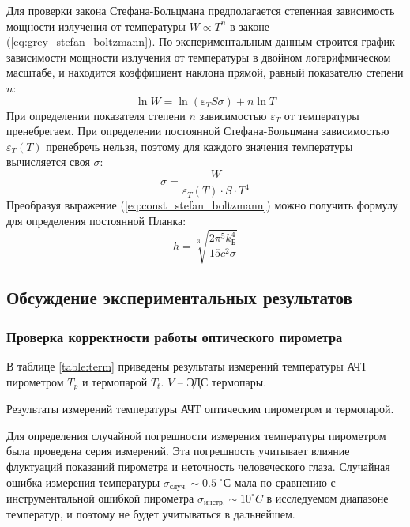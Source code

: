 \documentclass[10pt,a4paper]{article}
\newcommand{\cels}{\; ^\circ С}
\begin{document}
\begin{multicols}{2}
	Для проверки закона Стефана-Больцмана предполагается степенная зависимость мощности излучения от температуры $W \propto T^n$ в законе (\ref{eq:grey_stefan_boltzmann}). По экспериментальным данным строится график зависимости мощности излучения от температуры в двойном логарифмическом масштабе, и находится коэффициент наклона прямой, равный показателю степени $n$:
	\begin{equation}
		\ln W = \ln (\varepsilon_T S \sigma) + n \ln T
		\label{eq:lin_grey_stefan_boltzmann}
	\end{equation}
	При определении показателя степени $n$ зависимостью $\varepsilon_T$ от температуры пренебрегаем. При определении постоянной Стефана-Больцмана зависимостью $\varepsilon_T(T)$ пренебречь нельзя, поэтому для каждого значения температуры вычисляется своя $\sigma$:
	\begin{equation}
		\sigma = \frac{W}{\varepsilon_T(T) \cdot S \cdot T^4}
		\label{eq:calc_const_stefan_boltzman}
	\end{equation}
	Преобразуя выражение (\ref{eq:const_stefan_boltzmann}) можно получить формулу для определения постоянной Планка:
	\begin{equation}
		h = \sqrt[3]{\frac{2 \pi^5 k_Б^4}{15 c^2 \sigma}}
		\label{eq:calc_const_planck}
	\end{equation}
	
	\subsection*{Обсуждение экспериментальных результатов}
		
	\subsubsection*{Проверка корректности работы оптического пирометра}
	
	В таблице \ref{table:term} приведены результаты измерений температуры АЧТ пирометром $T_p$ и термопарой $T_t$. $V$ -- ЭДС термопары.
	
	\begin{table}[H]
		\addtolength{\tabcolsep}{-4pt}
		\footnotesize
		
		\label{table:term}
		\caption{Результаты измерений температуры АЧТ оптическим пирометром и термопарой.}
	\end{table}
	
	Для определения случайной погрешности измерения температуры пирометром была проведена серия измерений. Эта погрешность учитывает влияние флуктуаций показаний пирометра и неточность человеческого глаза. Случайная ошибка измерения температуры $\sigma_{случ.} \sim 0.5 \cels$ мала по сравнению с инструментальной ошибкой пирометра $\sigma_{инстр.} \sim 10^\circ C$ в исследуемом диапазоне температур, и поэтому не будет учитываться в дальнейшем.
	

\end{multicols}
\end{document}
